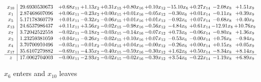 \documentclass[9pt]{article}
\begin{document}
 \[\begin{array}{c| c c@{\hskip 2pt} c@{\hskip 2pt} c@{\hskip 2pt} c@{\hskip 2pt} c@{\hskip 2pt} c@{\hskip 2pt} c@{\hskip 2pt} c@{\hskip 2pt} c@{\hskip 2pt} }
 x_{10}   &  29.6930530673 & +  0.68 x_{11} & +  1.13 x_{2} & +  0.31 x_{15} & +  0.80 x_{16} & +  0.10 x_{12} & -15.10 x_{6} & +  0.27 x_{14} & -2.08 x_{8} & +  1.51 x_{9}\\
 x_{1}   &  2.87468607096 & +  0.06 x_{11} & -0.23 x_{2} & +  0.00 x_{15} & +  0.01 x_{16} & -0.05 x_{12} & -0.30 x_{6} & +  0.01 x_{14} & -0.11 x_{8} & +  0.39 x_{9}\\
 x_{5}   &  5.17178360779 & +  0.01 x_{11} & -0.32 x_{2} & -0.06 x_{15} & +  0.01 x_{16} & +  0.01 x_{12} & -0.92 x_{6} & +  0.07 x_{14} & -0.68 x_{8} & +  0.40 x_{9}\\
 x_{13}   &  24.6537986437 & +  0.11 x_{11} & +  3.56 x_{2} & -0.02 x_{15} & -0.98 x_{16} & -0.56 x_{12} & -4.84 x_{6} & +  0.61 x_{14} & -12.91 x_{8} & + 10.76 x_{9}\\
 x_{7}   &  3.72042522558 & -0.02 x_{11} & -0.18 x_{2} & -0.03 x_{15} & -0.14 x_{16} & -0.07 x_{12} & +  0.73 x_{6} & -0.06 x_{14} & -0.80 x_{8} & +  1.36 x_{9}\\
 x_{3}   &  1.23259381059 & +  0.04 x_{11} & -0.26 x_{2} & -0.02 x_{15} & +  0.10 x_{16} & +  0.07 x_{12} & -0.53 x_{6} & -0.00 x_{14} & +  0.76 x_{8} & -0.94 x_{9}\\
 x_{4}   &  3.70700910496 & -0.03 x_{11} & -0.01 x_{2} & -0.04 x_{15} & +  0.04 x_{16} & -0.00 x_{12} & -0.26 x_{6} & +  0.00 x_{14} & +  0.15 x_{8} & +  0.05 x_{9}\\
 x_{17}   &  35.6107279882 & -0.69 x_{11} & -4.35 x_{2} & -0.40 x_{15} & -0.59 x_{16} & -0.30 x_{12} & +  1.62 x_{6} & +  0.50 x_{14} & -8.34 x_{8} & +  8.14 x_{9}\\
\hline
z    &  17.0062704003 & -0.00 x_{11} & -2.93 x_{2} & -0.02 x_{15} & -0.02 x_{16} & -0.39 x_{12} & +  3.54 x_{6} & -0.22 x_{14} & -1.19 x_{8} & +  6.89 x_{9}\\
\end{array}\]


 $ x_{6} $ enters and $ x_{10} $ leaves 
\end{document}

